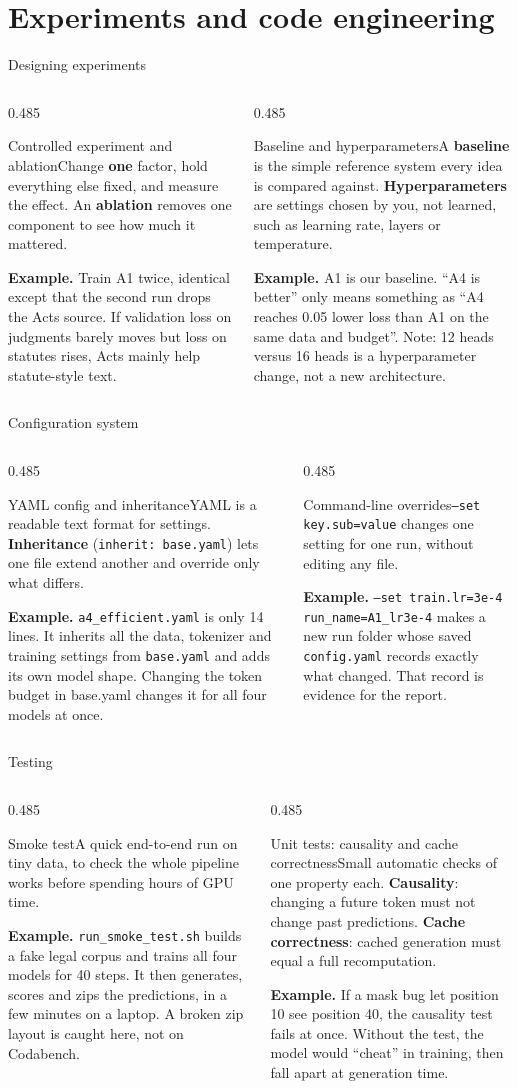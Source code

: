 \documentclass[aspectratio=169,11pt]{beamer}
\newcommand{\code}[1]{\texttt{\small #1}}
\newcommand{\term}[3]{%
  \begin{block}{#1}\small #2\par\vspace{1mm}%
  {\color{exgreen}\textbf{Example.}} #3\end{block}}
\newcommand{\twoterms}[6]{%
  \begin{columns}[T]
    \begin{column}{0.485\textwidth}\term{#1}{#2}{#3}\end{column}
    \begin{column}{0.485\textwidth}\term{#4}{#5}{#6}\end{column}
  \end{columns}}
\begin{document}
\section{Experiments and code engineering}

\begin{frame}{Designing experiments}
  \twoterms{Controlled experiment and ablation}
  {Change \textbf{one} factor, hold everything else fixed, and measure the effect. An \textbf{ablation} removes one component to see how much it mattered.}
  {Train A1 twice, identical except that the second run drops the Acts source. If validation loss on judgments barely moves but loss on statutes rises, Acts mainly help statute-style text.}
  {Baseline and hyperparameters}
  {A \textbf{baseline} is the simple reference system every idea is compared against. \textbf{Hyperparameters} are settings chosen by you, not learned, such as learning rate, layers or temperature.}
  {A1 is our baseline. ``A4 is better'' only means something as ``A4 reaches 0.05 lower loss than A1 on the same data and budget''. Note: 12 heads versus 16 heads is a hyperparameter change, not a new architecture.}
\end{frame}

\begin{frame}{Configuration system}
  \twoterms{YAML config and inheritance}
  {YAML is a readable text format for settings. \textbf{Inheritance} (\code{inherit: base.yaml}) lets one file extend another and override only what differs.}
  {\code{a4\_efficient.yaml} is only 14 lines. It inherits all the data, tokenizer and training settings from \code{base.yaml} and adds its own model shape. Changing the token budget in base.yaml changes it for all four models at once.}
  {Command-line overrides}
  {\code{--set key.sub=value} changes one setting for one run, without editing any file.}
  {\code{--set train.lr=3e-4 run\_name=A1\_lr3e-4} makes a new run folder whose saved \code{config.yaml} records exactly what changed. That record is evidence for the report.}
\end{frame}

\begin{frame}{Testing}
  \twoterms{Smoke test}
  {A quick end-to-end run on tiny data, to check the whole pipeline works before spending hours of GPU time.}
  {\code{run\_smoke\_test.sh} builds a fake legal corpus and trains all four models for 40 steps. It then generates, scores and zips the predictions, in a few minutes on a laptop. A broken zip layout is caught here, not on Codabench.}
  {Unit tests: causality and cache correctness}
  {Small automatic checks of one property each. \textbf{Causality}: changing a future token must not change past predictions. \textbf{Cache correctness}: cached generation must equal a full recomputation.}
  {If a mask bug let position 10 see position 40, the causality test fails at once. Without the test, the model would ``cheat'' in training, then fall apart at generation time.}
\end{frame}
\end{document}
